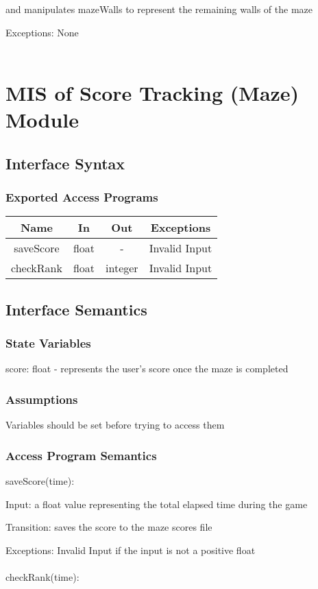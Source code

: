 \documentclass[12pt, titlepage]{article}
\begin{document}
		and manipulates mazeWalls to represent the remaining walls of the maze
		
		Exceptions: None\\
		\\

\section{MIS of Score Tracking (Maze) Module}
		\subsection{Interface Syntax}
		\subsubsection{Exported Access Programs}
		\begin{tabular}[pos]{|c|c|c|c|}
			\hline
			\textbf{Name}& \textbf{In} & \textbf{Out} & \textbf{Exceptions} \\ \hline
			saveScore & float & - & Invalid Input \\ \hline
			checkRank & float & integer & Invalid Input \\ \hline
		\end{tabular}
		
		\subsection{Interface Semantics}
		\subsubsection{State Variables}
		score: float - represents the user's score once the maze is completed
		\subsubsection{Assumptions}
		Variables should be set before trying to access them
		
		\subsubsection{Access Program Semantics}
		saveScore(time):
		
		Input: a float value representing the total elapsed time during the game
		
		Transition: saves the score to the maze scores file
		
		Exceptions: Invalid Input if the input is not a positive float \\
		\\
		checkRank(time):
		
\end{document}
